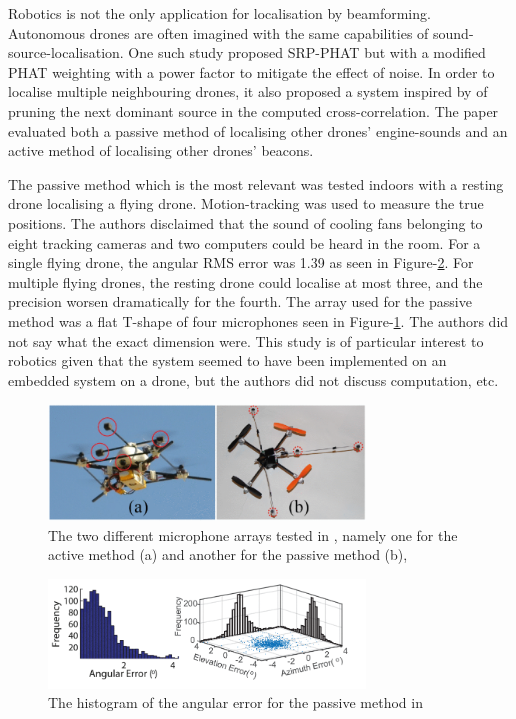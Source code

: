 \documentclass[notitlepage]{report}
\begin{document}
Robotics is not the only application for localisation by beamforming. Autonomous drones are often imagined with the same capabilities of sound-source-localisation. One such study \cite{basiri_-board_2016} proposed SRP-PHAT but with a modified PHAT weighting with a power factor to mitigate the effect of noise. In order to localise multiple neighbouring drones, it also proposed a system inspired by \cite{brutti_multiple_2010} of pruning the next dominant source in the computed cross-correlation. The paper evaluated both a passive method of localising other drones' engine-sounds and an active method of localising other drones' beacons. 

The passive method which is the most relevant was tested indoors with a resting drone localising a flying drone. Motion-tracking was used to measure the true positions. The authors disclaimed that the sound of cooling fans belonging to eight tracking cameras and two computers could be heard in the room. For a single flying drone, the angular RMS error was 1.39 \si{\deg} as seen in Figure-\ref{fig:basiri_2016_histogram}. For multiple flying drones, the resting drone could localise at most three, and the precision worsen dramatically for the fourth. The array used for the passive method was a flat T-shape of four microphones seen in Figure-\ref{fig:basiri_2016_array}. The authors did not say what the exact dimension were. This study is of particular interest to robotics given that the system seemed to have been implemented on an embedded system on a drone, but the authors did not discuss computation, etc.

\begin{figure}[H]
\includegraphics[width=0.75\textwidth]{./basiri_2016/array.png}
\centering
\caption{The two different microphone arrays tested in \cite{basiri_-board_2016}, namely one for the active method (a) and another for the passive method (b),}
\label{fig:basiri_2016_array}
\centering
\end{figure}

\begin{figure}[H]
\includegraphics[width=0.75\textwidth]{./basiri_2016/histogram.png}
\centering
\caption{The histogram of the angular error for the passive method in \cite{basiri_-board_2016}}
\label{fig:basiri_2016_histogram}
\centering
\end{figure}
\end{document}
